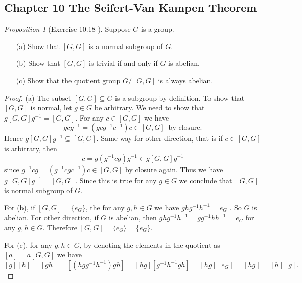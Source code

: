 \documentclass[a4paper]{article}
\theoremstyle{remark}
\newtheorem{prop}{Proposition}
\begin{document}
\subsection*{Chapter 10 The Seifert-Van Kampen Theorem}
\begin{prop}[Exercise 10.18 \cite{LeeTM}]
Suppose $G$ is a group.
\begin{itemize}[nolistsep]
    \item [(a)] Show that $[G,G]$ is a normal subgroup of $G$.
    \item [(b)] Show that $[G,G]$ is trivial if and only if $G$ is abelian.
    \item [(c)] Show that the quotient group $G/[G,G]$ is always abelian. 
\end{itemize}
\end{prop}
\begin{proof}
(a) The subset $[G,G] \subseteq G$ is a subgroup by definition. To show that $[G,G]$ is normal, let $g \in G$ be arbitrary. We need to show that $g[G,G]g^{-1} = [G,G]$. For any $c \in [G,G]$ we have
$$
gcg^{-1} = (gcg^{-1}c^{-1})c \in [G,G]\, \text{ by closure.}
$$
Hence $g[G,G]g^{-1} \subseteq [G,G]$. Same way for other direction, that is if $c \in [G,G]$ is arbitrary, then
$$
c = g(g^{-1}cg)g^{-1} \in g[G,G]g^{-1}
$$
since $g^{-1}cg = (g^{-1}cgc^{-1})c \in [G,G]$ by closure again. Thus we have $g[G,G]g^{-1} = [G,G]$. Since this is true for any $g \in G$ we conclude that $[G,G]$ is normal subgroup of $G$.

For (b), if $[G,G] = \{e_G\}$, the for any $g,h \in G$ we have $ghg^{-1}h^{-1} = e_G$ . So $G$ is abelian. For other direction, if $G$ is abelian, then $ghg^{-1}h^{-1} = gg^{-1}hh^{-1} = e_G$ for any $g,h \in G$. Therefore $[G,G] = \langle e_G \rangle = \{e_G\}$.

For (c), for any $g,h \in G$, by denoting the elements in the quotient as $[a] = a[G,G]$ we have
$$
[g][h]=[gh] = [(hgg^{-1}h^{-1})gh] = [hg][g^{-1}h^{-1}gh]= [hg][e_G] = [hg] =[h][g].  
$$
\end{proof}
\end{document}
